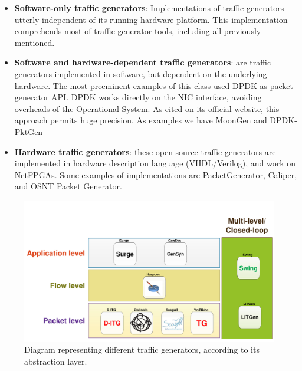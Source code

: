 \begin{itemize}

\item \textbf{Software-only traffic generators}: Implementations of traffic generators utterly independent of its running hardware platform. This implementation comprehends most of traffic generator tools, including all previously mentioned. 

\item \textbf{Software and hardware-dependent traffic generators}: are traffic generators implemented in software, but dependent on the underlying hardware. The most preeminent examples of this class used DPDK\cite{web-dpdk} as packet-generator API. DPDK works directly on the \acrshort{NIC} interface, avoiding overheads of the Operational System. As cited on its official website, this approach permits huge precision. As examples we have MoonGen\cite{moongen-paper} and DPDK-PktGen\cite{web-dpdk-pktgen}

\item \textbf{Hardware traffic generators}: these open-source traffic generators are implemented in hardware description language (VHDL/Verilog), and work on \acrshort{NetFPGA}s. Some examples of implementations are PacketGenerator\cite{pktgen-netfpga-paper}, Caliper\cite{caliper-paper}, and OSNT Packet Generator\cite{osnt-paper}.

\end{itemize}


\begin{figure}[!ht]
	\centering
	\includegraphics[scale=0.4]{figures/ch2/types-workload-tools}
	\caption{Diagram representing different traffic generators, according to its abstraction layer.}
	\label{fig:layers-workload-tools}
\end{figure}





